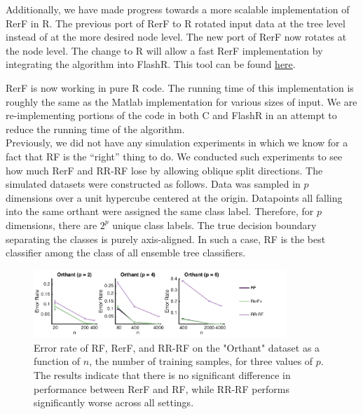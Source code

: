 \documentclass[simplex.tex]{subfiles}
\begin{document}
Additionally, we have made progress towards a more scalable implementation of RerF in R. The previous port of RerF to R rotated input data at the tree level instead 
of at the more desired node level.  The new port of RerF now rotates at the
node level.  The change to R will allow a fast RerF implementation by 
integrating the algorithm into FlashR.  This tool can be found \href{https://github.com/neurodata/R-RerF}{here}.


\clearpage

RerF is now working in pure R code.  The running time of this
implementation is roughly the same as the Matlab implementation for
various sizes of input.  We are re-implementing portions of the code in
both C and FlashR in an attempt to reduce the running time of the
algorithm. \\


Previously, we did not have any simulation experiments in which we know
for a fact that RF is the ``right'' thing to do. We conducted such
experiments to see how much RerF and RR-RF lose by allowing oblique
split directions. The simulated datasets were constructed as follows.
Data was sampled in $p$ dimensions over a unit hypercube centered at the
origin. Datapoints all falling into the same orthant were assigned the
same class label. Therefore, for $p$ dimensions, there are $2^p$ unique
class labels. The true decision boundary separating the classes is
purely axis-aligned. In such a case, RF is the best classifier among the
class of all ensemble tree classifiers.

\begin{figure}[!h]
\begin{cframed}
\centering
\includegraphics[width=0.85\textwidth]{../../figs/RerF_2017_02.png}
\caption{Error rate of RF, RerF, and RR-RF on the "Orthant" dataset as a
  function of $n$, the number of training samples, for three values of
  $p$. The results indicate that there is no significant difference in
  performance between RerF and RF, while RR-RF performs significantly
  worse across all settings.}
\label{fig:name}
\end{cframed}
\end{figure}
\end{document}
